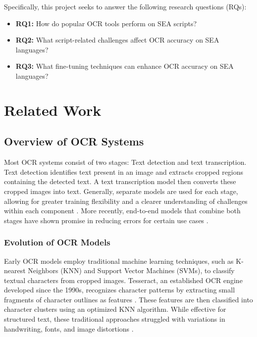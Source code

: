 \documentclass[12pt,oneside]{memoir}
\begin{document}
Specifically, this project seeks to answer the following research questions (RQs):

\begin{itemize}
    \item \textbf{RQ1:} How do popular OCR tools perform on SEA scripts?
    \item \textbf{RQ2:} What script-related challenges affect OCR accuracy on SEA languages?
    \item \textbf{RQ3:} What fine-tuning techniques can enhance OCR accuracy on SEA languages?
\end{itemize}

\chapter{Related Work}

\section{Overview of OCR Systems}

Most OCR systems consist of two stages: Text detection and text transcription.
Text detection identifies text present in an image and extracts cropped regions containing the detected text. 
A text transcription model then converts these cropped images into text.
Generally, separate models are used for each stage, allowing for greater training flexibility and a clearer understanding of challenges within each component \parencite{subramani-etal-2023}. 
More recently, end-to-end models that combine both stages have shown promise in reducing errors for certain use cases \parencite{feng-etal-2019}.

\subsection{Evolution of OCR Models}

Early OCR models employ traditional machine learning techniques, such as K-nearest Neighbors (KNN) and Support Vector Machines (SVMs), to classify textual characters from cropped images.
Tesseract, an established OCR engine developed since the 1990s, recognizes character patterns by extracting small fragments of character outlines as features \parencite{smith-2013}.
These features are then classified into character clusters using an optimized KNN algorithm.
While effective for structured text, these traditional approaches struggled with variations in handwriting, fonts, and image distortions \parencite{subramani-etal-2023}.
\end{document}
